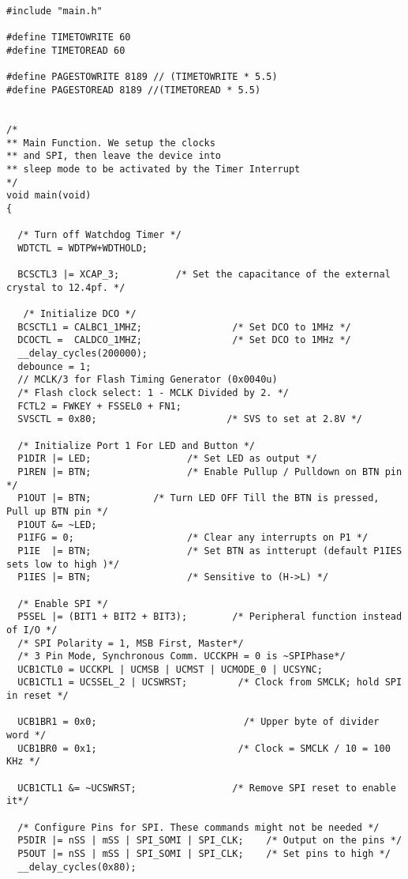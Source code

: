 \begin{lstlisting}[caption=Main.c,label=Code4]
#include "main.h"
        
#define TIMETOWRITE 60
#define TIMETOREAD 60

#define PAGESTOWRITE 8189 // (TIMETOWRITE * 5.5)
#define PAGESTOREAD 8189 //(TIMETOREAD * 5.5)


/*
** Main Function. We setup the clocks
** and SPI, then leave the device into 
** sleep mode to be activated by the Timer Interrupt
*/
void main(void)
{
  
  /* Turn off Watchdog Timer */
  WDTCTL = WDTPW+WDTHOLD;                   

  BCSCTL3 |= XCAP_3;          /* Set the capacitance of the external crystal to 12.4pf. */  
  
   /* Initialize DCO */
  BCSCTL1 = CALBC1_1MHZ;                /* Set DCO to 1MHz */
  DCOCTL =  CALDCO_1MHZ;                /* Set DCO to 1MHz */
  __delay_cycles(200000);
  debounce = 1;
  // MCLK/3 for Flash Timing Generator (0x0040u) 
  /* Flash clock select: 1 - MCLK Divided by 2. */
  FCTL2 = FWKEY + FSSEL0 + FN1;             
  SVSCTL = 0x80;                       /* SVS to set at 2.8V */
  
  /* Initialize Port 1 For LED and Button */
  P1DIR |= LED;                 /* Set LED as output */
  P1REN |= BTN;                 /* Enable Pullup / Pulldown on BTN pin */
  P1OUT |= BTN;           /* Turn LED OFF Till the BTN is pressed, Pull up BTN pin */
  P1OUT &= ~LED;            
  P1IFG = 0;                    /* Clear any interrupts on P1 */
  P1IE  |= BTN;                 /* Set BTN as intterupt (default P1IES sets low to high )*/
  P1IES |= BTN;                 /* Sensitive to (H->L) */
  
  /* Enable SPI */
  P5SEL |= (BIT1 + BIT2 + BIT3);        /* Peripheral function instead of I/O */
  /* SPI Polarity = 1, MSB First, Master*/
  /* 3 Pin Mode, Synchronous Comm. UCCKPH = 0 is ~SPIPhase*/
  UCB1CTL0 = UCCKPL | UCMSB | UCMST | UCMODE_0 | UCSYNC; 
  UCB1CTL1 = UCSSEL_2 | UCSWRST;         /* Clock from SMCLK; hold SPI in reset */
  
  UCB1BR1 = 0x0;                          /* Upper byte of divider word */
  UCB1BR0 = 0x1;                         /* Clock = SMCLK / 10 = 100 KHz */
  
  UCB1CTL1 &= ~UCSWRST;                 /* Remove SPI reset to enable it*/
  
  /* Configure Pins for SPI. These commands might not be needed */
  P5DIR |= nSS | mSS | SPI_SOMI | SPI_CLK;    /* Output on the pins */      
  P5OUT |= nSS | mSS | SPI_SOMI | SPI_CLK;    /* Set pins to high */
  __delay_cycles(0x80);
  

\end{lstlisting}
